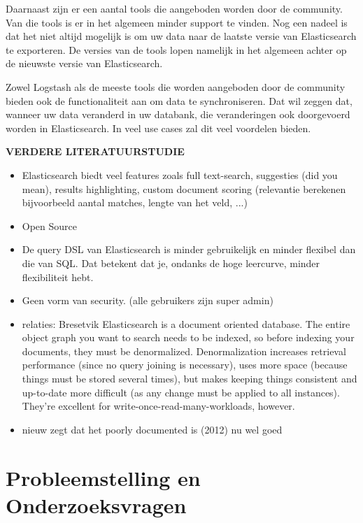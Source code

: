 {Daarnaast zijn er een aantal tools die aangeboden worden door de community. Van die tools is er in het algemeen minder support te vinden. Nog een nadeel is dat het niet altijd mogelijk is om uw data naar de laatste versie van Elasticsearch te exporteren. De versies van de tools lopen namelijk in het algemeen achter op de nieuwste versie van Elasticsearch. 

Zowel Logstash als de meeste tools die worden aangeboden door de community bieden ook de functionaliteit aan om data te synchroniseren. Dat wil zeggen dat, wanneer uw data veranderd in uw databank, die veranderingen ook doorgevoerd worden in Elasticsearch. In veel use cases zal dit veel voordelen bieden. 

\textbf{VERDERE LITERATUURSTUDIE}

\begin{itemize}
	\item Elasticsearch biedt veel features zoals full text-search, suggesties (did you mean), results highlighting, custom document scoring (relevantie berekenen bijvoorbeeld aantal matches, lengte van het veld, ...) 
	\item Open Source
	\item De query DSL van Elasticsearch is minder gebruikelijk en minder flexibel dan die van SQL. Dat betekent dat je, ondanks de hoge leercurve, minder flexibiliteit hebt.  
	\item Geen vorm van security. (alle gebruikers zijn super admin) 
	\item relaties: Bresetvik Elasticsearch is a document oriented database. The entire object graph you want to search needs to be indexed, so before indexing your documents, they must be denormalized. Denormalization increases retrieval performance (since no query joining is necessary), uses more space (because things must be stored several times), but makes keeping things consistent and up-to-date more difficult (as any change must be applied to all instances). They're excellent for write-once-read-many-workloads, however.
	\item nieuw zegt dat het poorly documented is (2012) nu wel goed
\end{itemize}




\section{Probleemstelling en Onderzoeksvragen}
\label{sec:onderzoeksvragen}

}
